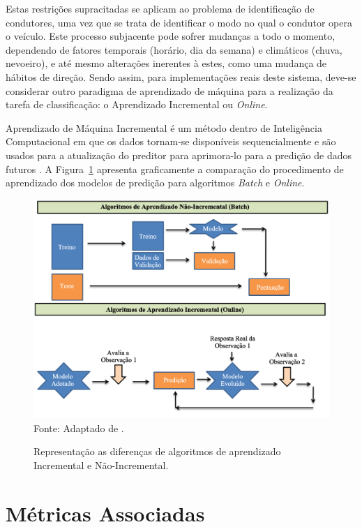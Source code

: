 Estas restrições supracitadas se aplicam ao problema de identificação de condutores, uma vez que se trata de identificar o modo no qual o condutor opera o veículo. Este processo subjacente pode sofrer mudanças a todo o momento, dependendo de fatores temporais (horário, dia da semana) e climáticos (chuva, nevoeiro), e até mesmo alterações inerentes à estes, como uma mudança de hábitos de direção. Sendo assim, para implementações reais deste sistema, deve-se considerar outro paradigma de aprendizado de máquina para a realização da tarefa de classificação: o Aprendizado Incremental ou \textit{Online}.

Aprendizado de Máquina Incremental é um método dentro de Inteligência Computacional em que os dados tornam-se disponíveis sequencialmente e são usados para a atualização do preditor para aprimora-lo para a predição de dados futuros \cite{fontenla2013online}. A Figura~\ref{fig:apdz} apresenta graficamente a comparação do procedimento de aprendizado dos modelos de predição para algoritmos \textit{Batch} e \textit{Online}.

\begin{figure}[!htb]
	\centering
	\caption{Representação as diferenças de algoritmos de aprendizado Incremental e Não-Incremental.}
	\includegraphics[width=0.9\linewidth]{aprendizado.eps}\\
	{\small Fonte: Adaptado de .}
	\label{fig:apdz}
\end{figure}


\section{Métricas Associadas}


